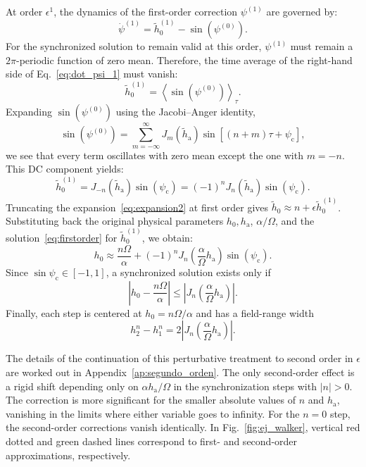 \documentclass[prb,aps,twocolumn,superscriptaddress,floatfix]{revtex4-2}
\begin{document}
At order $\epsilon^1$, the dynamics of the first-order correction $\psi^{(1)}$ are governed by:
\begin{equation}
    \dot{\psi}^{(1)} = \tilde h_0^{(1)} - \sin\left(\psi^{(0)}\right).
    \label{eq:dot_psi_1}
\end{equation}
For the synchronized solution to remain valid at this order, $\psi^{(1)}$ must remain a $2\pi$-periodic function of zero mean. Therefore, the time average of the right-hand side of Eq.~\eqref{eq:dot_psi_1} must vanish:
\begin{equation}
    \tilde h_0^{(1)} = \left\langle \sin\left(\psi^{(0)}\right) \right\rangle_\tau.
\end{equation}
Expanding $\sin\left(\psi^{(0)}\right)$ using the Jacobi--Anger identity,
\begin{equation}
    \sin\left(\psi^{(0)}\right) = \sum_{m=-\infty}^{\infty}J_{m} (\tilde h_\text{a})\sin[(n+m)\tau+\psi_\text{c}],
\end{equation}
we see that every term oscillates with zero mean except the one with $m=-n$. This DC component yields:
\begin{equation}
    \tilde h_0^{(1)} = J_{-n}(\tilde h_\text{a})\sin(\psi_\text{c}) = (-1)^{n}J_{n} (\tilde h_\text{a})\sin(\psi_\text{c}).
    \label{eq:firstorder}
\end{equation}
Truncating the expansion~\eqref{eq:expansion2} at first order gives $\tilde h_0 \approx n + \epsilon \tilde h_0^{(1)}$. Substituting back the original physical parameters $h_0, h_\text{a}$, $\alpha/\Omega$, and the solution~\eqref{eq:firstorder} for $\tilde h_0^{(1)}$, we obtain:
\begin{equation}
    h_{0} \approx \frac{n\Omega}{\alpha} +(-1)^{n}J_{n} \left(\frac{\alpha}{\Omega}h_\text{a}\right)\sin(\psi_\text{c}). 
\end{equation}
Since $\sin \psi_\text{c}\in [-1,1]$, a synchronized solution exists only if
\begin{equation}
    \left| h_{0} - \frac{n\Omega}{\alpha} \right| \leq \left|J_{n}\left(\frac{\alpha}{\Omega}h_\text{a}\right) \right|.
    \label{eq:walkerwithAC}
\end{equation}
Finally, each step is centered at $h_{0}=n\Omega/\alpha$ and has a field-range width 
\begin{equation}
    h^{n}_{2}-h^{n}_{1}=2 \left|  J_{n}\left(\frac{\alpha}{\Omega}h_\text{a}\right) \right|.
    \label{eq:width_steps}
\end{equation}

The details of the continuation of this perturbative treatment to second order in $\epsilon$ are worked out in Appendix~\ref{ap:segundo_orden}. The only second-order effect is a rigid shift depending only on $\alpha h_\text{a}/\Omega$ in the synchronization steps with $|n|>0$. The correction is more significant for the smaller absolute values of $n$ and $h_\text{a}$, vanishing in the limits where either variable goes to infinity. For the $n=0$ step, the second-order corrections vanish identically. In Fig.~\ref{fig:ej_walker}, vertical red dotted and green dashed lines correspond to first- and second-order approximations, respectively.
\end{document}
